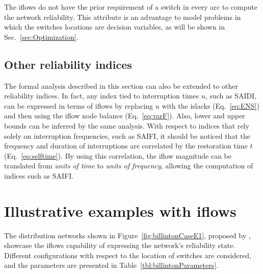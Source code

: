 The iflows do not have the prior requirement of a switch in every arc to compute the network reliability.  This attribute is an advantage  to model problems in which the switches locations are decision variables, as will be shown in Sec.~\ref{sec:Optimization}.


\subsection{Other reliability indices} \label{ssec:otherIndices}


The formal analysis described in this section can also be extended to other reliability indices. In fact, any index tied to interruption times $u$, such as SAIDI, can be expressed in terms of iflows by replacing $u$ with the islacks (Eq.~\ref{eq:ENS}) and then using the iflow node balance (Eq.~\ref{eq:varF}). Also, lower and upper bounds can be inferred by the same analysis. 
With respect to indices that rely solely on interruption frequencies, such as SAIFI, it should be noticed that the frequency and duration of interruptions are correlated by the restoration time $t$ (Eq.~\ref{eq:selftime}). By using this correlation, the iflow magnitude can be translated from \textit{units of time} to \textit{units of frequency}, allowing the computation of indices such as SAIFI.


\section{Illustrative examples with iflows} \label{sec:Examples}

The distribution networks shown in Figure~\ref{fig:billintonCaseE1}, proposed by \cite{billinton}, showcase the iflows capability of expressing the network's reliability state. 
Different configurations with respect to the location of switches are considered, and the parameters are presented in Table~\ref{tbl:billintonParameters}. 

